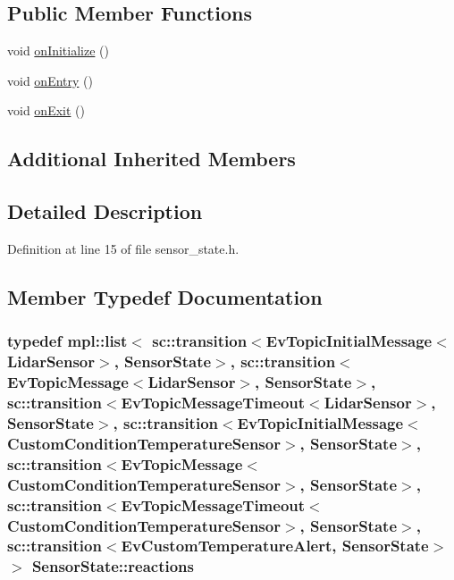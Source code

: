 \subsection*{Public Member Functions}
\begin{DoxyCompactItemize}
\item 
void \hyperlink{structSensorState_a6044eeac11b62bbc073ea844b29b96d7}{on\+Initialize} ()
\item 
void \hyperlink{structSensorState_a8737846a096cedd7656aa9030586ef39}{on\+Entry} ()
\item 
void \hyperlink{structSensorState_ab740060f1d0a2d5056a74da07cea994e}{on\+Exit} ()
\end{DoxyCompactItemize}
\subsection*{Additional Inherited Members}


\subsection{Detailed Description}


Definition at line 15 of file sensor\+\_\+state.\+h.



\subsection{Member Typedef Documentation}
\subsubsection[{\texorpdfstring{reactions}{reactions}}]{\setlength{\rightskip}{0pt plus 5cm}typedef mpl\+::list$<$ sc\+::transition$<${\bf Ev\+Topic\+Initial\+Message}$<${\bf Lidar\+Sensor}$>$, {\bf Sensor\+State}$>$, sc\+::transition$<${\bf Ev\+Topic\+Message}$<${\bf Lidar\+Sensor}$>$, {\bf Sensor\+State}$>$, sc\+::transition$<${\bf Ev\+Topic\+Message\+Timeout}$<${\bf Lidar\+Sensor}$>$, {\bf Sensor\+State}$>$, sc\+::transition$<${\bf Ev\+Topic\+Initial\+Message}$<${\bf Custom\+Condition\+Temperature\+Sensor}$>$, {\bf Sensor\+State}$>$, sc\+::transition$<${\bf Ev\+Topic\+Message}$<${\bf Custom\+Condition\+Temperature\+Sensor}$>$, {\bf Sensor\+State}$>$, sc\+::transition$<${\bf Ev\+Topic\+Message\+Timeout}$<${\bf Custom\+Condition\+Temperature\+Sensor}$>$, {\bf Sensor\+State}$>$, sc\+::transition$<${\bf Ev\+Custom\+Temperature\+Alert}, {\bf Sensor\+State}$>$ $>$ {\bf Sensor\+State\+::reactions}}\hypertarget{structSensorState_aad643eee73f46db780c8f30fde51d23f}{}\label{structSensorState_aad643eee73f46db780c8f30fde51d23f}


